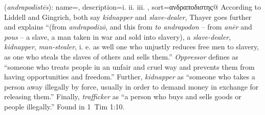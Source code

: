 \item[Oppressor,]

(\textit{andrapodistēs}):
{
    name=,
    description={i.  ii.  iii. },
    sort=ανδραποδιστης@
}
According to Liddell and Gingrich, both say \emph{kidnapper} and \emph{slave-dealer}, Thayer goes further and explains ``(from \emph{andrapodizō}, and this from \emph{to andrapodon} -- from \emph{anēr} and \emph{pous} -- a slave, a man taken in war and sold into slavery), a \emph{slave-dealer}, \emph{kidnapper}, \emph{man-stealer}, i. e. as well one who unjustly reduces free men to slavery, as one who steals the slaves of others and sells them.'' 
\emph{Oppressor} defines as ``someone who treats people in an unfair and cruel way and prevents them from having opportunities and freedom.'' 
Further, \emph{kidnapper} as ``someone who takes a person away illegally by force, usually in order to demand money in exchange for releasing them.'' 
Finally, \emph{trafficker} as ``a person who buys and sells goods or people illegally.''
Found in 1~Tim 1:10.
